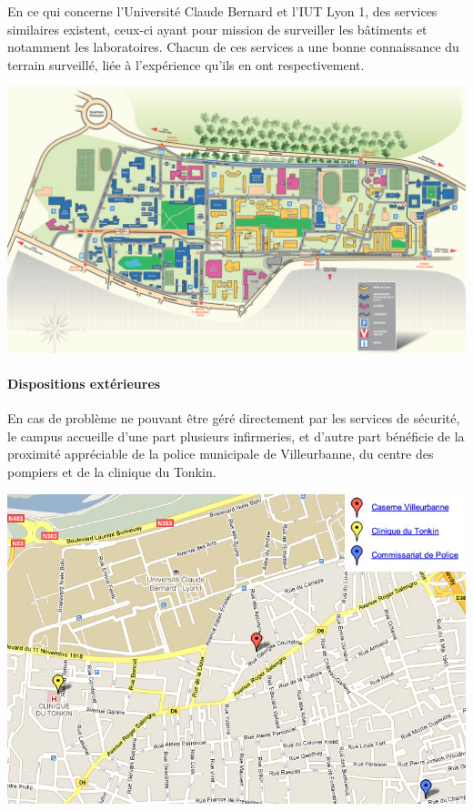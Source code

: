\documentclass[hidelinks, paper=a4, fontsize=13pt]{report}
\begin{document}
En ce qui concerne l’Université Claude Bernard et l’IUT Lyon 1, des services similaires existent, ceux-ci ayant pour mission de surveiller les bâtiments et notamment les laboratoires. Chacun de ces services a une bonne connaissance du terrain surveillé, liée à l’expérience qu’ils en ont respectivement.

\begin{center}
	\includegraphics[width=.8\textwidth]{Annexes/Plans/planDeSituation}
\end{center}

\paragraph{Dispositions extérieures}
En cas de problème ne pouvant être géré directement par les services de sécurité, le campus accueille d’une part plusieurs infirmeries, et d’autre part bénéficie de la proximité appréciable de la police municipale de Villeurbanne, du centre des pompiers et de la clinique du Tonkin.
\begin{center}
	\includegraphics[scale=0.6]{Annexes/Plans/centreSecours}
\end{center}
\newpage
\end{document}
